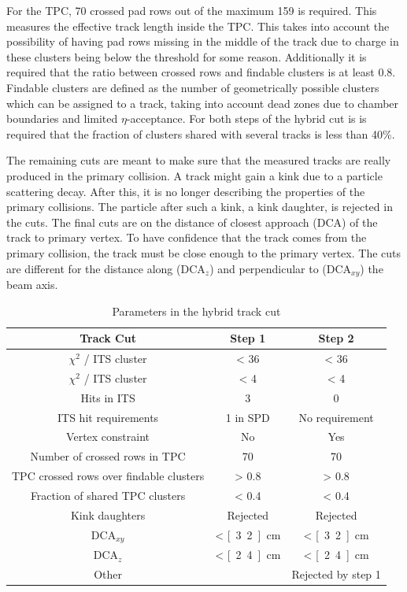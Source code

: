 For the TPC, 70 crossed pad rows out of the maximum 159 is required. This measures the effective track length inside the TPC. This takes into account the possibility of having pad rows missing in the middle of the track due to charge in these clusters being below the threshold for some reason. Additionally it is required that the ratio between crossed rows and findable clusters is at least 0.8. Findable clusters are defined as the number of geometrically possible clusters which can be assigned to a track, taking into account dead zones due to chamber boundaries and limited $\eta$-acceptance. For both steps of the hybrid cut is is required that the fraction of clusters shared with several tracks is less than 40\%.


The remaining cuts are meant to make sure that the measured tracks are really produced in the primary collision. A track might gain a kink due to a particle scattering decay. After this, it is no longer describing the properties of the primary collisions. The particle after such a kink, a kink daughter, is rejected in the cuts. The final cuts are on the distance of closest approach (DCA) of the track to primary vertex. To have confidence that the track comes from the primary collision, the track must be close enough to the primary vertex. The cuts are different for the distance along ($\mathrm{DCA}_{z}$) and perpendicular to ($\mathrm{DCA}_{xy}$) the beam axis.


\begin{table}
\caption{Parameters in the hybrid track cut}
\label{tab:hybrid}
\begin{tabular}{c | c | c}
Track Cut & Step 1 & Step 2 \\
\hline
$\chi^2$ / ITS cluster & < 36 & < 36 \\
$\chi^2$ / ITS cluster & < 4 & < 4 \\
Hits in ITS & 3 & 0 \\
ITS hit requirements & 1 in SPD & No requirement \\
Vertex constraint & No & Yes \\
Number of crossed rows in TPC  & 70 & 70 \\
TPC crossed rows over findable clusters & > 0.8 & > 0.8 \\
Fraction of shared TPC clusters & < 0.4 & < 0.4 \\
Kink daughters & Rejected & Rejected \\
$\mathrm{DCA}_{xy}$ & < \unit[3.2]{cm} & < \unit[3.2]{cm} \\
$\mathrm{DCA}_{z}$ & < \unit[2.4]{cm} & < \unit[2.4]{cm} \\
Other & & Rejected by step 1 \\
\end{tabular}
\end{table}



